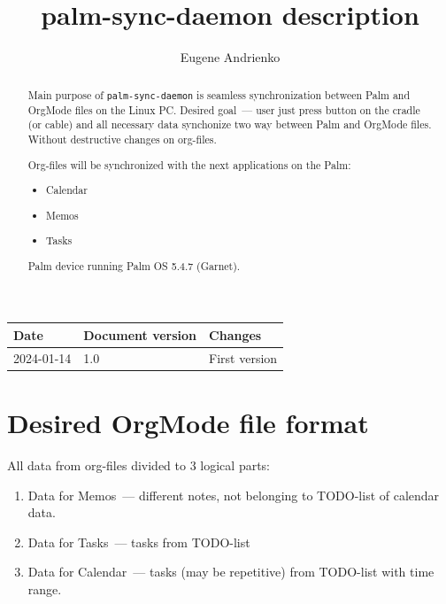\documentclass[a4paper,12pt,oneside]{scrartcl}
\title{palm-sync-daemon description}
\author{Eugene Andrienko}
\begin{document}
\clearpage
\maketitle
\thispagestyle{empty}
\newpage

\pagestyle{fancy}
\lhead{}
\chead{}
\lfoot{}
\rfoot{}


\tableofcontents
\listoffigures
\listoftables
\lstlistoflistings

\newpage

\begin{tabular}{|l|l|l|}
  \hline
  \textbf{Date} & \textbf{Document version} & \textbf{Changes} \\
  \hline
  2024-01-14 & 1.0 & First version \\
  \hline
\end{tabular}

\newpage


\begin{abstract}
  Main purpose of \texttt{palm-sync-daemon} is seamless synchronization between
  Palm and OrgMode files on the Linux PC. Desired goal~--- user just press
  button on the cradle (or cable) and all necessary data synchonize two way
  between Palm and OrgMode files. Without destructive changes on org-files.

  Org-files will be synchronized with the next applications on the Palm:
  \begin{itemize}
  \item Calendar
  \item Memos
  \item Tasks
  \end{itemize}

  Palm device running Palm OS 5.4.7 (Garnet).
\end{abstract}

\section{Desired OrgMode file format}
\label{sec:desired-orgmode-file}

All data from org-files divided to 3 logical parts:
\begin{enumerate}
\item Data for Memos~--- different notes, not belonging to TODO-list of calendar
  data.
\item Data for Tasks~--- tasks from TODO-list
\item Data for Calendar~--- tasks (may be repetitive) from TODO-list with time
  range.
\end{enumerate}
\end{document}

